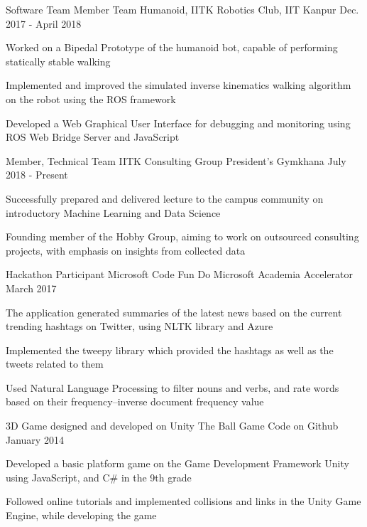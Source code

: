 
\begin{cventries}

  \cventry
    {Software Team Member} 
    {Team Humanoid, IITK}
    {Robotics Club, IIT Kanpur}
    {Dec. 2017 - April 2018} 
    {
      \begin{cvitems} 
        \item {Worked on a Bipedal Prototype of the humanoid bot, capable of performing statically stable walking}
        \item {Implemented and improved the simulated inverse kinematics walking algorithm on the robot using the ROS framework}
        \item {Developed a Web Graphical User Interface for debugging and monitoring using ROS Web Bridge Server and JavaScript}
      \end{cvitems}
    }

  \cventry
    {Member, Technical Team}
    {IITK Consulting Group}
    {President's Gymkhana} 
    {July 2018 - Present}
    {
      \begin{cvitems}
        \item {Successfully prepared and delivered lecture to the campus community on introductory Machine Learning and Data Science}
        \item {Founding member of the Hobby Group, aiming to work on outsourced consulting projects, with emphasis on insights from collected data}
      \end{cvitems}
    }

  \cventry
    {Hackathon Participant}
    {Microsoft Code Fun Do} 
    {Microsoft Academia Accelerator}
    {March 2017}
    {
      \begin{cvitems} 
        \item {The application generated summaries of the latest news based on the current trending hashtags on Twitter, using NLTK library and Azure}
        \item {Implemented the tweepy library which provided the hashtags as well as the tweets related to them}
        \item {Used Natural Language Processing to filter nouns and verbs, and rate words based on their frequency–inverse document frequency value}
      \end{cvitems}
    }

  \cventry
    {3D Game designed and developed on Unity} 
    {The Ball Game} 
    {Code on Github}
    {January 2014}
    {
      \begin{cvitems}
        \item {Developed a basic platform game on the Game Development Framework Unity using JavaScript, and C\# in the 9th grade}
        \item {Followed online tutorials and implemented collisions and links in the Unity Game Engine, while developing the game}
      \end{cvitems}
    }

\end{cventries}
